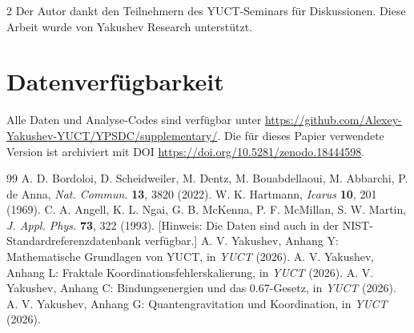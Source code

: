 \documentclass[11pt,a4paper]{article}
\begin{document}
\begin{multicols}{2}
		Der Autor dankt den Teilnehmern des YUCT-Seminars für Diskussionen. Diese Arbeit wurde von Yakushev Research unterstützt.
		
		\section*{Datenverfügbarkeit}
		Alle Daten und Analyse-Codes sind verfügbar unter \url{https://github.com/Alexey-Yakushev-YUCT/YPSDC/supplementary/}. Die für dieses Papier verwendete Version ist archiviert mit DOI \url{https://doi.org/10.5281/zenodo.18444598}.
		
		\begin{thebibliography}{99}
			 A. D. Bordoloi, D. Scheidweiler, M. Dentz, M. Bouabdellaoui, M. Abbarchi, P. de Anna, \emph{Nat. Commun.} \textbf{13}, 3820 (2022).
			 W. K. Hartmann, \emph{Icarus} \textbf{10}, 201 (1969).
			 C. A. Angell, K. L. Ngai, G. B. McKenna, P. F. McMillan, S. W. Martin, \emph{J. Appl. Phys.} \textbf{73}, 322 (1993). [Hinweis: Die Daten sind auch in der NIST-Standardreferenzdatenbank verfügbar.]
			 A. V. Yakushev, Anhang Y: Mathematische Grundlagen von YUCT, in \emph{YUCT} (2026).
			 A. V. Yakushev, Anhang L: Fraktale Koordinationsfehlerskalierung, in \emph{YUCT} (2026).
			 A. V. Yakushev, Anhang C: Bindungsenergien und das 0.67-Gesetz, in \emph{YUCT} (2026).
			 A. V. Yakushev, Anhang G: Quantengravitation und Koordination, in \emph{YUCT} (2026).
		\end{thebibliography}
		
	\end{multicols}
\end{document}

